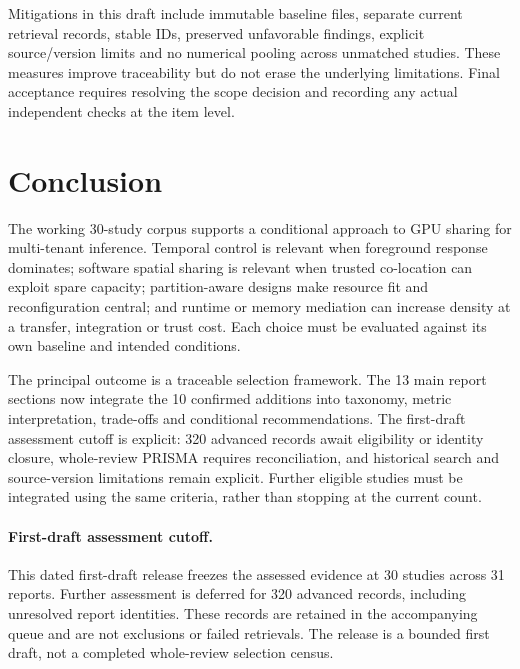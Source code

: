 Mitigations in this draft include immutable baseline files, separate current retrieval records, stable IDs, preserved unfavorable findings, explicit source/version limits and no numerical pooling across unmatched studies. These measures improve traceability but do not erase the underlying limitations. Final acceptance requires resolving the scope decision and recording any actual independent checks at the item level.

\section{Conclusion}
The working 30-study corpus supports a conditional approach to GPU sharing for multi-tenant inference. Temporal control is relevant when foreground response dominates; software spatial sharing is relevant when trusted co-location can exploit spare capacity; partition-aware designs make resource fit and reconfiguration central; and runtime or memory mediation can increase density at a transfer, integration or trust cost. Each choice must be evaluated against its own baseline and intended conditions.

The principal outcome is a traceable selection framework. The 13 main report sections now integrate the 10 confirmed additions into taxonomy, metric interpretation, trade-offs and conditional recommendations. The first-draft assessment cutoff is explicit: 320 advanced records await eligibility or identity closure, whole-review PRISMA requires reconciliation, and historical search and source-version limitations remain explicit. Further eligible studies must be integrated using the same criteria, rather than stopping at the current count.

\paragraph{First-draft assessment cutoff.} This dated first-draft release freezes the assessed evidence at 30 studies across 31 reports. Further assessment is deferred for 320 advanced records, including unresolved report identities. These records are retained in the accompanying queue and are not exclusions or failed retrievals. The release is a bounded first draft, not a completed whole-review selection census.
